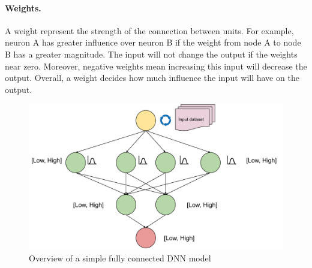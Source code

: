 \paragraph{Weights.} A weight represent the strength of the connection between units. For example, neuron A has greater influence over neuron B if the weight from node A to node B has a greater magnitude. The input will not change the output if the weights near zero. Moreover, negative weights mean increasing this input will decrease the output. Overall, a weight decides how much influence the input will have on the output.
\begin{figure}
	\includegraphics[width=\linewidth]{overview}
	\caption{Overview of a simple fully connected DNN model}
	\label{fig:rq5}
\end{figure}
